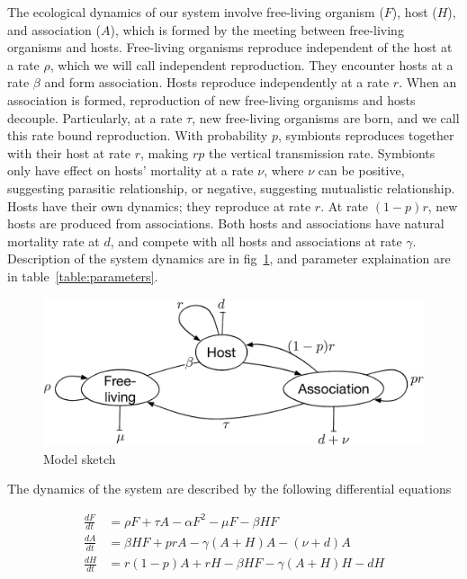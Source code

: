 \documentclass[11pt]{article}
\begin{document}
The ecological dynamics of our system involve free-living organism ($F$), host ($H$), and association ($A$), which is formed by the meeting between free-living organisms and hosts. Free-living organisms reproduce independent of the host at a rate $\rho$, which we will call independent reproduction. They encounter hosts at a rate $\beta$ and form association. Hosts reproduce independently at a rate $r$. When an association is formed, reproduction of new free-living organisms and hosts decouple. Particularly, at a rate $\tau$, new free-living organisms are born, and we call this rate bound reproduction. With probability $p$, symbionts reproduces together with their host at rate $r$, making $r p$ the vertical transmission rate. Symbionts only have effect on hosts' mortality at a rate $\nu$, where $\nu$ can be positive, suggesting parasitic relationship, or negative, suggesting mutualistic relationship. Hosts have their own dynamics; they reproduce at rate $r$. At rate $(1-p)r$, new hosts are produced from associations. Both hosts and associations have natural mortality rate at $d$, and compete with all hosts and associations at rate $\gamma$. Description of the system dynamics are in fig~\ref{Fig:model_sketch}, and  parameter explaination are in table~\ref{table:parameters}. 

\begin{figure}[ht!]
	\centering
	\includegraphics[width=0.7 \linewidth]{model_sketch}
	\caption{Model sketch}
	\label{Fig:model_sketch}
\end{figure}

The dynamics of the system are described by the following differential equations

\begin{align}
	\frac{dF}{dt}     & = \rho F +\tau A - \alpha F^2 - \mu F - \beta H F \\
	\frac{dA}{dt}    & = \beta H F +  p r A - \gamma (A + H) A - (\nu + d)  A \\
	\frac{dH}{dt}    & = r (1 - p) A + r  H -\beta H F   - \gamma (A + H) H - d H 
\end{align}
\end{document}
